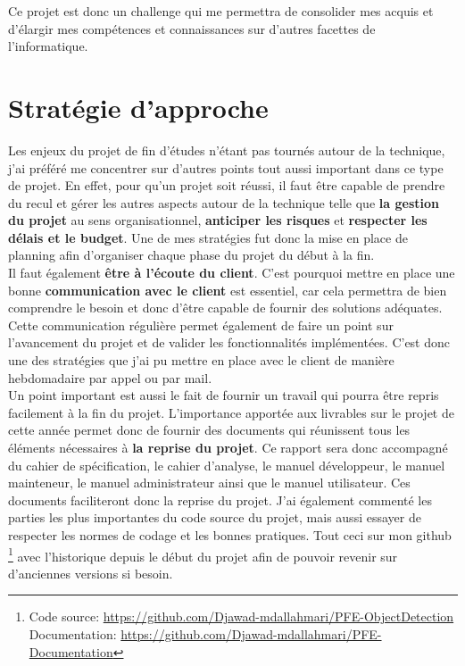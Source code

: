 \documentclass[UTF8]{EPURapport}
\begin{document}
Ce projet est donc un challenge qui me permettra de consolider mes acquis et d'élargir mes compétences et connaissances sur d'autres facettes de l'informatique.

\section{Stratégie d'approche}

Les enjeux du projet de fin d'études n'étant pas tournés autour de la technique, j'ai préféré me concentrer sur d'autres points tout aussi important dans ce type de projet. En effet, pour qu'un projet soit réussi, il faut être capable de prendre du recul et gérer les autres aspects autour de la technique telle que \textbf{la gestion du projet} au sens organisationnel, \textbf{anticiper les risques} et \textbf{respecter les délais et le budget}. Une de mes stratégies fut donc la mise en place de planning afin d'organiser chaque phase du projet du début à la fin.\\

Il faut également \textbf{être à l'écoute du client}. C'est pourquoi mettre en place une bonne \textbf{communication avec le client} est essentiel, car cela permettra de bien comprendre le besoin et donc d'être capable de fournir des solutions adéquates. Cette communication régulière permet également de faire un point sur l'avancement du projet et de valider les fonctionnalités implémentées. C'est donc une des stratégies que j'ai pu mettre en place avec le client de manière hebdomadaire par appel ou par mail.\\

Un point important est aussi le fait de fournir un travail qui pourra être repris facilement à la fin du projet. L'importance apportée aux livrables sur le projet de cette année permet donc de fournir des documents qui réunissent tous les éléments nécessaires à \textbf{la reprise du projet}. Ce rapport sera donc accompagné du cahier de spécification, le cahier d'analyse, le manuel développeur, le manuel mainteneur, le manuel administrateur ainsi que le manuel utilisateur. Ces documents faciliteront donc la reprise du projet. J'ai également commenté les parties les plus importantes du code source du projet, mais aussi essayer de respecter les normes de codage et les bonnes pratiques. Tout ceci sur mon github \footnote{ Code source: \url{https://github.com/Djawad-mdallahmari/PFE-ObjectDetection} \\ Documentation: \url{https://github.com/Djawad-mdallahmari/PFE-Documentation}} avec l'historique depuis le début du projet afin de pouvoir revenir sur d'anciennes versions si besoin.
\end{document}
